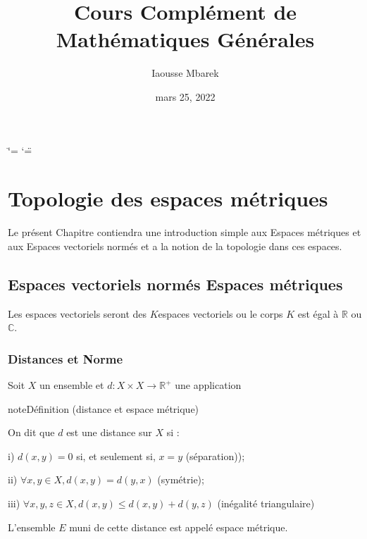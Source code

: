 \documentclass[letterpaper,10pt,french]{sphinxmanual}
\title{Cours Complément de Mathématiques Générales}
\date{mars 25, 2022}
\author{Iaousse M\textquotesingle{}barek}
\begin{document}
\ifdefined\shorthandoff
  \ifnum\catcode`\=\string=\active\shorthandoff{=}\fi
  \ifnum\catcode`\"=\active{}\fi
\fi

\pagestyle{empty}
\sphinxmaketitle
\pagestyle{plain}
\sphinxtableofcontents
\pagestyle{normal}
\label{\detokenize{intro::doc}}



\chapter{Topologie des espaces métriques}
\label{\detokenize{metric-norme:topologie-des-espaces-metriques}}\label{\detokenize{metric-norme::doc}}
\sphinxAtStartPar
Le présent Chapitre contiendra une introduction simple aux Espaces métriques et aux Espaces vectoriels normés et a la notion de la topologie dans ces espaces.


\section{Espaces vectoriels normés \sphinxhyphen{} Espaces métriques}
\label{\detokenize{mnspace:espaces-vectoriels-normes-espaces-metriques}}\label{\detokenize{mnspace::doc}}
\sphinxAtStartPar
Les espaces vectoriels seront des \(K\)\sphinxhyphen{}espaces vectoriels ou le corps \(K\) est égal à \(\mathbb R\) ou \(\mathbb C\).


\subsection{Distances et Norme}
\label{\detokenize{mnspace:distances-et-norme}}
\sphinxAtStartPar
Soit \(X\) un ensemble et \( d : X \times X \to \mathbb R^+\) une application

\begin{sphinxadmonition}{note}{Définition (distance et espace métrique)}

\sphinxAtStartPar
On dit que \(d\) est une distance sur \(X\) si :

\sphinxAtStartPar
i) \(d(x,y) = 0\) si, et seulement si, \(x=y\) (séparation));

\sphinxAtStartPar
ii) \(\forall x, y \in X, d(x,y) = d(y,x)\) (symétrie);

\sphinxAtStartPar
iii) \(\forall x,y, z \in X, d(x,y) \leq d(x,y) + d(y,z)\) (inégalité triangulaire)
\end{sphinxadmonition}

\sphinxAtStartPar
L’ensemble \(E\) muni de cette distance est appelé espace métrique.
\end{document}
